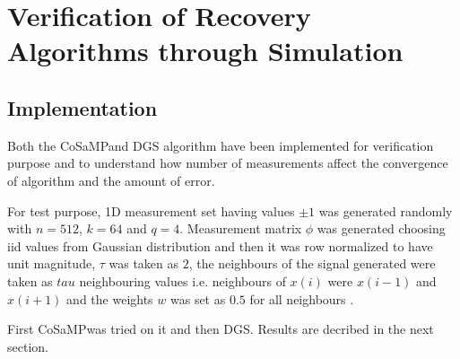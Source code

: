 \documentclass[12pt]{article}
\theoremstyle{definition}
\def\cosamp{CoSaMP\hspace{0.1in}}
\begin{document}
\section{Verification of Recovery Algorithms through Simulation}
  \subsection{Implementation}
  Both the \cosamp and DGS algorithm have been implemented for verification purpose and to understand how 
  number of measurements affect the convergence of algorithm and the amount of error.
  
  \par For test purpose, 1D measurement set having values $\pm 1$ was generated randomly with $n=512$, $k=64$ and $q=4$.
  Measurement matrix $\phi$ was generated choosing iid values from Gaussian distribution and then it was row normalized
  to have unit magnitude, $\tau$ was taken as $2$, the neighbours of the signal generated were taken as $tau$ neighbouring
  values i.e. neighbours of $x(i)$ were $x(i-1)$ and $x(i+1)$ 
  and the weights $w$ was set as $0.5$ for all neighbours \cite{Huang-DGS}.
  \par First \cosamp was tried on it and then DGS. Results are decribed in the next section.
\end{document}
